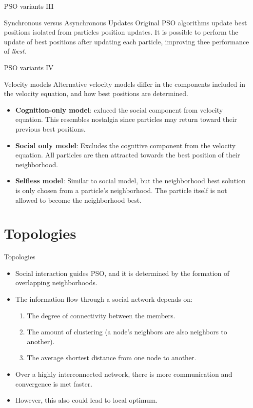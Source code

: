 \documentclass[aspectratio=169,compress,10pt]{beamer}
\begin{document}
\begin{frame}{PSO variants III}
\begin{block}{Synchronous versus Asynchronous Updates}
Original PSO algorithms update best positions isolated from particles position updates.
It is possible to perform the update of best positions after updating each particle, improving thee performance of \emph{lbest}.
\end{block}
\end{frame}

\begin{frame}{PSO variants IV}
\begin{block}{Velocity models}
Alternative velocity models differ in the components included in the velocity equation, and how best positions are determined.
\begin{itemize}
	\item \textbf{Cognition-only model}: exluced the social component from velocity equation.
	This resembles nostalgia since particles may return toward their previous best positions.
	\item \textbf{Social only model}: Excludes the cognitive component from the velocity equation.
	All particles are then attracted towards the best position of their neighborhood.
	\item \textbf{Selfless model}:
	Similar to social model, but the neighborhood best solution is only chosen from a particle's neighborhood.
	The particle itself is not allowed to become the neighborhood best.
\end{itemize}
\end{block}
\end{frame}

\section{Topologies} 
\begin{frame}{Topologies}
\begin{itemize}
	\item Social interaction guides PSO, and it is determined by the formation of overlapping neighborhoods.
	\item The information flow through a social network depends on:
	\begin{enumerate}
		\item The degree of connectivity between the members.
		\item The amount of clustering (a node's neighbors are also neighbors to another).
		\item The average shortest distance from one node to another.
	\end{enumerate}
	\item Over a highly interconnected network, there is more communication and convergence is met faster.
	\item However, this also could lead to local optimum.
\end{itemize}
\end{frame}
\end{document}
